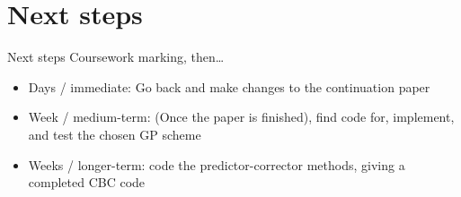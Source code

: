 \documentclass[presentation]{beamer}
\begin{document}
\section{Next steps}
\label{sec:org096e920}
\begin{frame}[label={sec:orgbb19b69}]{Next steps}
Coursework marking, then\ldots{}

\vfill

\begin{itemize}
\item Days / immediate: Go back and make changes to the continuation paper
\item Week  / medium-term: (Once the paper is finished), find code for, implement, and test the chosen GP scheme
\item Weeks / longer-term: code the predictor-corrector methods, giving a completed CBC code
\end{itemize}
\end{frame}
\end{document}
